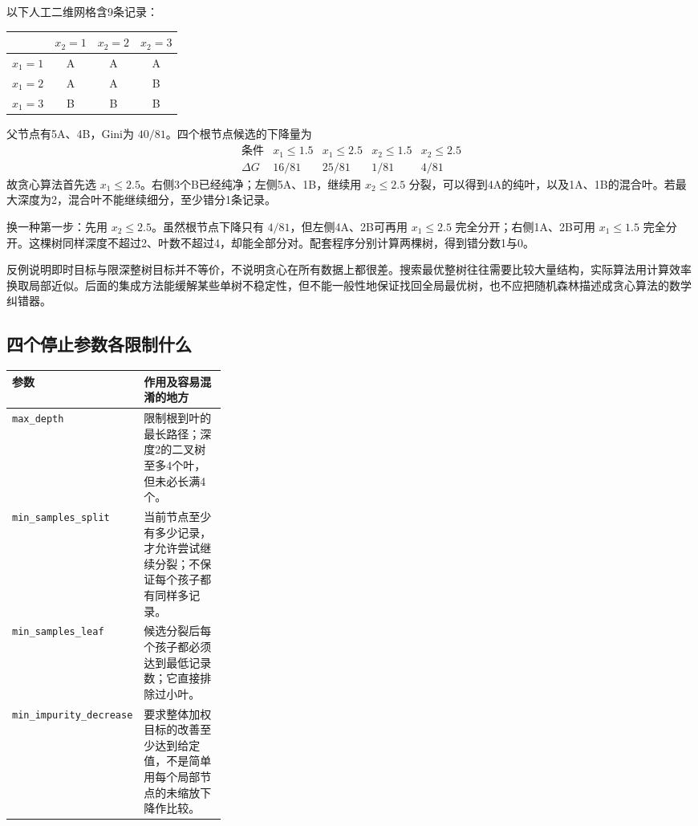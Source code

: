 以下人工二维网格含9条记录：
\begin{center}
\begin{tabular}{lccc}\toprule
&$x_2=1$&$x_2=2$&$x_2=3$\\\midrule
$x_1=1$&A&A&A\\
$x_1=2$&A&A&B\\
$x_1=3$&B&B&B\\\bottomrule
\end{tabular}\end{center}
父节点有5A、4B，Gini为 $40/81$。四个根节点候选的下降量为
\[
\begin{array}{c|cccc}
\text{条件}&x_1\leq1.5&x_1\leq2.5&x_2\leq1.5&x_2\leq2.5\\\hline
\Delta G&16/81&25/81&1/81&4/81
\end{array}
\]
故贪心算法首先选 $x_1\leq2.5$。右侧3个B已经纯净；左侧5A、1B，继续用 $x_2\leq2.5$ 分裂，可以得到4A的纯叶，以及1A、1B的混合叶。若最大深度为2，混合叶不能继续细分，至少错分1条记录。

换一种第一步：先用 $x_2\leq2.5$。虽然根节点下降只有 $4/81$，但左侧4A、2B可再用 $x_1\leq2.5$ 完全分开；右侧1A、2B可用 $x_1\leq1.5$ 完全分开。这棵树同样深度不超过2、叶数不超过4，却能全部分对。配套程序分别计算两棵树，得到错分数1与0。


反例说明即时目标与限深整树目标并不等价，不说明贪心在所有数据上都很差。搜索最优整树往往需要比较大量结构，实际算法用计算效率换取局部近似。后面的集成方法能缓解某些单树不稳定性，但不能一般性地保证找回全局最优树，也不应把随机森林描述成贪心算法的数学纠错器。

\subsection{四个停止参数各限制什么}
\begin{center}\small
\begin{tabularx}{\linewidth}{p{0.31\linewidth}X}\toprule
参数&作用及容易混淆的地方\\\midrule
\texttt{max\_depth}&限制根到叶的最长路径；深度2的二叉树至多4个叶，但未必长满4个。\\
\texttt{min\_samples\_split}&当前节点至少有多少记录，才允许尝试继续分裂；不保证每个孩子都有同样多记录。\\
\texttt{min\_samples\_leaf}&候选分裂后每个孩子都必须达到最低记录数；它直接排除过小叶。\\
\texttt{min\_impurity\_decrease}&要求整体加权目标的改善至少达到给定值，不是简单用每个局部节点的未缩放下降作比较。\\\bottomrule
\end{tabularx}\end{center}

